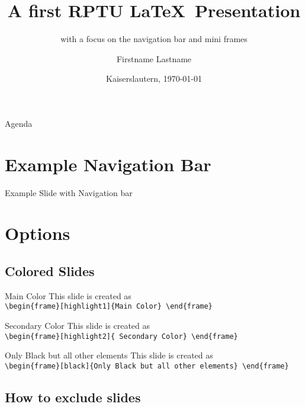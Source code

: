 \documentclass[aspectratio=169]{beamer}
\title[RPTU \LaTeX\ Presentation]{A first RPTU \LaTeX\ Presentation}
\subtitle{with a focus on the navigation bar and mini frames}
\date{Kaiserslautern, \today}
\author[Last Name]{Firstname Lastname}
\institute[Short Institute]{Institute}
\begin{document}
\begin{frame}
	\titlepage
\end{frame}

\begin{frame}[minimal]{Agenda}
	\tableofcontents
\end{frame}

\section{Example Navigation Bar}
\rptusectionpage
\begin{frame}{Example Slide with Navigation bar}
	\lipsum[3]
\end{frame}


\section{Options}
\subsection{Colored Slides}
\rptusectionpage

\begin{frame}[highlight1]{Main Color}
	This slide is created as\\
	\texttt{\textbackslash begin\{frame\}[highlight1]\{Main Color\}
\textbackslash end\{frame\}	
}
\end{frame}

\begin{frame}[highlight2]{Secondary Color}
	This slide is created as\\
	\texttt{\textbackslash begin\{frame\}[highlight2]\{ Secondary Color\}
		\textbackslash end\{frame\}
	}
\end{frame}

\begin{frame}[black]{Only Black but all other elements}
	This slide is created as\\
	\texttt{\textbackslash begin\{frame\}[black]\{Only Black but all other elements\}
		\textbackslash end\{frame\}	
	}
\end{frame}

\begin{frame}
	\lipsum[1]
\end{frame}

\subsection{How to exclude slides}
\rptusectionpage
\end{document}
